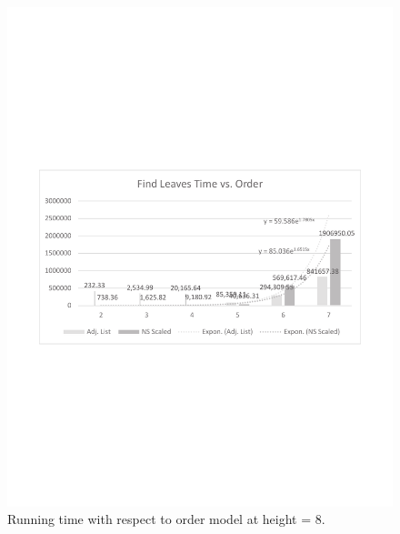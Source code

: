 \begin{figure}[!h]
\begin{center}
\includegraphics[width=6in]{images/eval/leaves/order/col_trend.pdf}
\caption{Running time with respect to order model at height = 8.\label{fig-leaves-order2}}
\end{center}
\end{figure}
